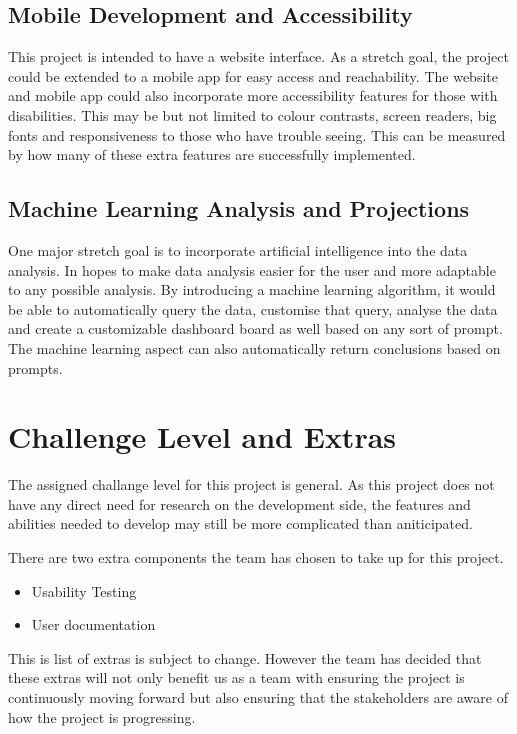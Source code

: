 \documentclass{article}
\begin{document}
\subsection{Mobile Development and Accessibility}
This project is intended to have a website interface. As a stretch goal, the
project could be extended to a mobile app for easy access and reachability. The
website and mobile app could also incorporate more accessibility features for
those with disabilities. This may be but not limited to colour contrasts, screen
readers, big fonts and responsiveness to those who have trouble seeing. This can
be measured by how many of these extra features are successfully implemented.
 
\subsection{Machine Learning Analysis and Projections}
One major stretch goal is to incorporate artificial intelligence into the data
analysis. In hopes to make data analysis easier for the user and more adaptable
to any possible analysis. By introducing a machine learning algorithm, it would
be able to automatically query the data, customise that query, analyse the data
and create a customizable dashboard board as well based on any sort of prompt.
The machine learning aspect can also automatically return conclusions based on
prompts.

\section{Challenge Level and Extras}

The assigned challange level for this project is general. As this project does
not have any direct need for research on the development side, the features and
abilities needed to develop may still be more complicated than aniticipated. 

\noindent There are two extra components the team has chosen to take up for this
project. 
\begin{itemize}
    \item Usability Testing
    \item User documentation
\end{itemize}
This is list of extras is subject to change. However the team has decided that
these extras will not only benefit us as a team with ensuring the project is
continuously moving forward but also ensuring that the stakeholders are aware of
how the project is progressing.
\end{document}
